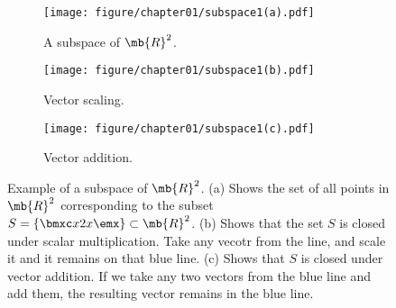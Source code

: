 \begin{figure}[h]
    \centering
    \begin{subfigure}[b]{0.32\textwidth}
        \texttt{[image: figure/chapter01/subspace1(a).pdf]}
        \caption{A subspace of $\mb{R}^2$.}
        \label{fig:ch01-subspace1}
    \end{subfigure}
    \begin{subfigure}[b]{0.32\textwidth}
        \centering
        \texttt{[image: figure/chapter01/subspace1(b).pdf]}
        \caption{Vector scaling.}
        \label{fig:ch01-subspace1-scale}
    \end{subfigure}
    \begin{subfigure}[b]{0.32\textwidth}
        \centering
        \texttt{[image: figure/chapter01/subspace1(c).pdf]}
        \caption{Vector addition.}
        \label{fig:ch01-subspace1-addition}
    \end{subfigure}
    \caption{Example of a subspace of $\mb{R}^2$. (a) Shows the set of all points in $\mb{R}^2$ corresponding to the subset $S = \left\{ \bmxc x \\ 2 x\emx\right\} \subset \mb{R}^2$. (b) Shows that the set $S$ is closed under scalar multiplication. Take any vecotr from the line, and scale it and it remains on that blue line. (c) Shows that $S$ is closed under vector addition. If we take any two vectors from the blue line and add them, the resulting vector remains in the blue line.}
\end{figure}    
    
